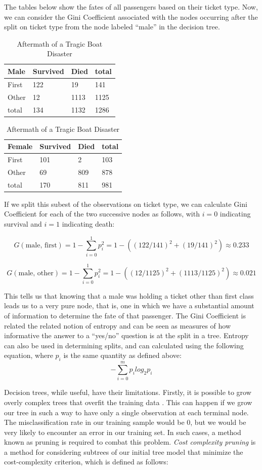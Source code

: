 \documentclass[preprint,12pt]{elsarticle}
\begin{document}
The tables below show the fates of all passengers based on their ticket type. Now, we can consider the Gini Coefficient associated with the nodes occurring after the split on ticket type from the node labeled ``male'' in the decision tree.

\begin{table}[h]
\begin{tabular}{|l | l l | l|}
\hline
 Male & Survived & Died & total\\
\hline
First & 122 & 19 & 141 \\
Other & 12 & 1113 & 1125 \\
\hline
total & 134 & 1132 & 1286 \\
\hline
\end{tabular}
\quad
\begin{tabular}{|l | l l | l|}
\hline
Female & Survived & Died & total\\
\hline
First & 101 & 2 & 103 \\
Other & 69 & 809 & 878 \\
\hline
total & 170 & 811 & 981 \\
\hline
\end{tabular}

\caption{Aftermath of a Tragic Boat Disaster}
\end{table}

\noindent If we split this subest of the observations on ticket type, we can calculate Gini Coefficient for each of the two successive nodes as follows, with $i=0$ indicating survival and $i=1$ indicating death:

$$G(\textrm{male, first}) = 1 - \sum\limits_{i=0}^1 p_{i}^{2} = 1 - ((122/141)^{2}+(19/141)^{2}) \approx 0.233 $$

$$G(\textrm{male, other}) = 1 - \sum\limits_{i=0}^1 p_{i}^{2} = 1 - ((12/1125)^{2}+(1113/1125)^{2}) \approx 0.021 $$

\noindent This tells us that knowing that a male was holding a ticket other than first class leads us to a very pure node, that is, one in which we have a substantial amount of information to determine the fate of that passenger. The Gini Coefficient is related the related notion of entropy and can be seen as measures of how informative the answer to a ``yes/no'' question is at the split in a tree. Entropy can also be used in determining splits, and can calculated using the following equation, where $p_{i}$ is the same quantity as defined above: 
$$-\sum\limits_{i=0}^m p_{i}log_{2}p_{i}$$

Decision trees, while useful, have their limitations. Firstly, it is possible to grow overly complex trees that overfit the training data \cite{ISLR}. This can happen if we grow our tree in such a way to have only a single observation at each terminal node. The misclassification rate in our training sample would be $0$, but we would be very likely to encounter an error in our training set. In such cases, a method known as pruning is required to combat this problem. \textit{Cost complexity pruning} is a method for considering subtrees of our initial tree model that minimize the cost-complexity criterion, which is defined as follows\cite{ESL}:
\end{document}

